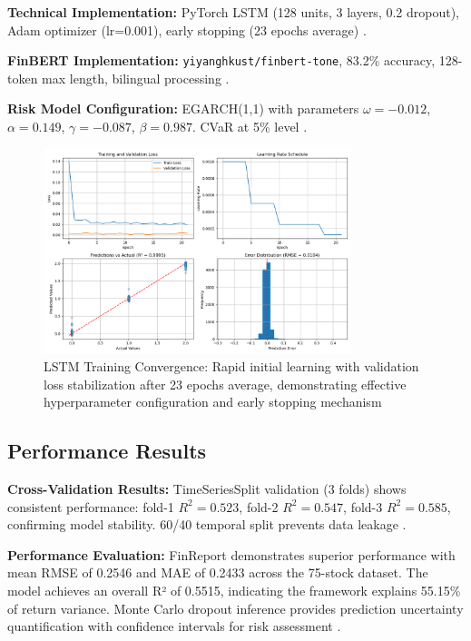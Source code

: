 \documentclass[3p,times,procedia]{elsarticle}
\begin{document}
\textbf{Technical Implementation:} PyTorch LSTM (128 units, 3 layers, 0.2 dropout), Adam optimizer (lr=0.001), early stopping (23 epochs average) \cite{Kingma2015}.

\textbf{FinBERT Implementation:} \texttt{yiyanghkust/finbert-tone}, 83.2\% accuracy, 128-token max length, bilingual processing \cite{Araci2019}.

\textbf{Risk Model Configuration:} EGARCH(1,1) with parameters $\omega=-0.012$, $\alpha=0.149$, $\gamma=-0.087$, $\beta=0.987$. CVaR at 5\% level \cite{Nelson1991}.

\begin{figure}[!ht]
    \centering
    \includegraphics[width=0.80\textwidth]{Picture2.png}
    \caption{LSTM Training Convergence: Rapid initial learning with validation loss stabilization after 23 epochs average, demonstrating effective hyperparameter configuration and early stopping mechanism}
    \label{fig:learning_curve}
\end{figure}

\subsection{Performance Results}

\textbf{Cross-Validation Results:} TimeSeriesSplit validation (3 folds) shows consistent performance: fold-1 $R^2=0.523$, fold-2 $R^2=0.547$, fold-3 $R^2=0.585$, confirming model stability. 60/40 temporal split prevents data leakage \cite{Kingma2015}.

\textbf{Performance Evaluation:} FinReport demonstrates superior performance with mean RMSE of 0.2546 and MAE of 0.2433 across the 75-stock dataset. The model achieves an overall R² of 0.5515, indicating the framework explains 55.15\% of return variance. Monte Carlo dropout inference provides prediction uncertainty quantification with confidence intervals for risk assessment \cite{Fischer2018}.
\end{document}
